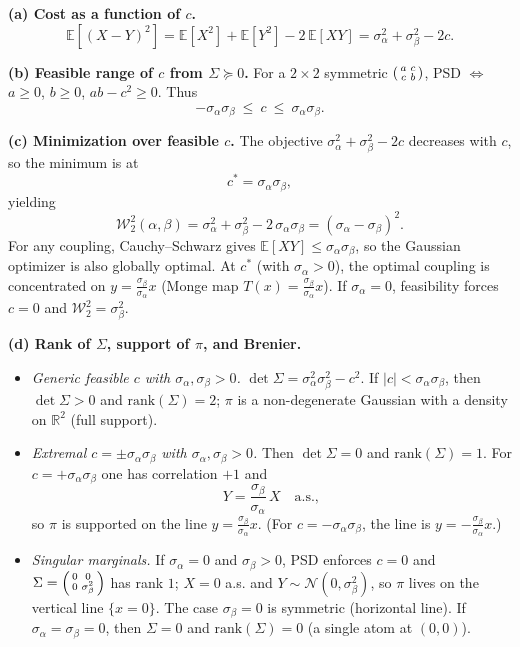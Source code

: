 \documentclass[11pt,a4paper]{article}
\theoremstyle{exostyle}
\newcommand{\R}{\mathbb{R}}
\newcommand{\Wtwo}{\mathcal{W}_2}
\begin{document}
\begin{solution}
\textbf{(a) Cost as a function of $c$.}
\[
\mathbb E[(X-Y)^2]=\mathbb E[X^2]+\mathbb E[Y^2]-2\,\mathbb E[XY]
=\sigma_\alpha^2+\sigma_\beta^2-2c.
\]

\medskip
\textbf{(b) Feasible range of $c$ from $\Sigma\succeq0$.}
For a $2\times2$ symmetric $\begin{psmallmatrix}a&c\\c&b\end{psmallmatrix}$, PSD $\Leftrightarrow$ $a\ge0$, $b\ge0$, $ab-c^2\ge0$.
Thus
\[
-\sigma_\alpha\sigma_\beta\ \le\ c\ \le\ \sigma_\alpha\sigma_\beta.
\]

\medskip
\textbf{(c) Minimization over feasible $c$.}
The objective $\sigma_\alpha^2+\sigma_\beta^2-2c$ decreases with $c$, so the minimum is at
\[
c^*=\sigma_\alpha\sigma_\beta,
\]
yielding
\[
\boxed{\ \Wtwo^2(\alpha,\beta)=\sigma_\alpha^2+\sigma_\beta^2-2\,\sigma_\alpha\sigma_\beta=(\sigma_\alpha-\sigma_\beta)^2.\ }
\]
For any coupling, Cauchy--Schwarz gives $\mathbb E[XY]\le\sigma_\alpha\sigma_\beta$, so the Gaussian optimizer is also globally optimal. At $c^*$ (with $\sigma_\alpha>0$), the optimal coupling is concentrated on $y=\frac{\sigma_\beta}{\sigma_\alpha}x$ (Monge map $T(x)=\frac{\sigma_\beta}{\sigma_\alpha}x$). If $\sigma_\alpha=0$, feasibility forces $c=0$ and $\Wtwo^2=\sigma_\beta^2$.

\medskip
\textbf{(d) Rank of $\Sigma$, support of $\pi$, and Brenier.}
\begin{itemize}[itemsep=2pt]
\item \emph{Generic feasible $c$ with $\sigma_\alpha,\sigma_\beta>0$.}
$\det\Sigma=\sigma_\alpha^2\sigma_\beta^2-c^2$.
If $|c|<\sigma_\alpha\sigma_\beta$, then $\det\Sigma>0$ and $\mathrm{rank}(\Sigma)=2$; $\pi$ is a non-degenerate Gaussian with a density on $\R^2$ (full support).

\item \emph{Extremal $c=\pm\sigma_\alpha\sigma_\beta$ with $\sigma_\alpha,\sigma_\beta>0$.}
Then $\det\Sigma=0$ and $\mathrm{rank}(\Sigma)=1$.
For $c=+\sigma_\alpha\sigma_\beta$ one has correlation $+1$ and
\[
Y=\frac{\sigma_\beta}{\sigma_\alpha}\,X\quad\text{a.s.},
\]
so $\pi$ is supported on the line $y=\frac{\sigma_\beta}{\sigma_\alpha}x$.
(For $c=-\sigma_\alpha\sigma_\beta$, the line is $y=-\frac{\sigma_\beta}{\sigma_\alpha}x$.)

\item \emph{Singular marginals.}
If $\sigma_\alpha=0$ and $\sigma_\beta>0$, PSD enforces $c=0$ and
$\Sigma=\begin{psmallmatrix}0&0\\0&\sigma_\beta^2\end{psmallmatrix}$ has rank $1$; $X=0$ a.s. and $Y\sim\mathcal N(0,\sigma_\beta^2)$, so $\pi$ lives on the vertical line $\{x=0\}$.
The case $\sigma_\beta=0$ is symmetric (horizontal line).
If $\sigma_\alpha=\sigma_\beta=0$, then $\Sigma=0$ and $\mathrm{rank}(\Sigma)=0$ (a single atom at $(0,0)$).


\end{itemize}
\end{solution}
\end{document}

